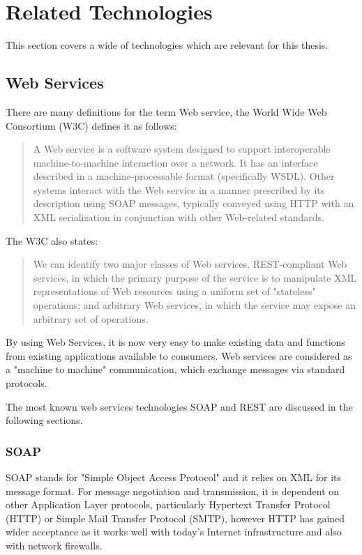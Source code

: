 \section{Related Technologies\label{sec:back_rel_tech}}
This section covers a wide of technologies which are relevant for this thesis.	

\subsection{Web Services\label{sec:back_tech_ws}}

There are many definitions for the term Web service, the World Wide Web Consortium (W3C) defines it as follows:\cite{W3C}\\
\begin{quote}
A Web service is a software system designed to support interoperable machine-to-machine interaction over a network. It has an interface described in a machine-processable format (specifically WSDL). Other systems interact with the Web service in a manner prescribed by its description using SOAP messages, typically conveyed using HTTP with an XML serialization in conjunction with other Web-related standards.
\end{quote}

The W3C also states:\cite{W3C} 
\begin{quote}
We can identify two major classes of Web services, REST-compliant Web services, in which the primary purpose of the service is to manipulate XML representations of Web resources using a uniform set of "stateless" operations; and arbitrary Web services, in which the service may expose an arbitrary set of operations.
\end{quote}

By using Web Services, it is now very easy to make existing data and functions from existing applications available to consumers. Web services are considered as a "machine to machine" communication, which  exchange messages via standard protocols.

The most known web services technologies SOAP and REST are discussed in the following sections.

\subsubsection{SOAP\label{sec:back_tech_ws_soap}}
SOAP stands for "Simple Object Access Protocol" and it relies on  XML for its message format. For message negotiation and transmission, it is dependent on other Application Layer protocols, particularly Hypertext Transfer Protocol (HTTP) or Simple Mail Transfer Protocol (SMTP), however HTTP has gained wider acceptance as it works well with today's Internet infrastructure and also with network firewalls.

